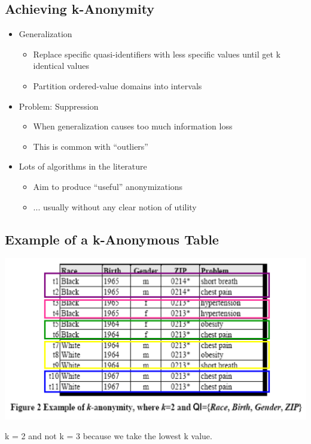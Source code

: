 \documentclass[11pt]{article}
\theoremstyle{definition}
\begin{document}
\subsection{Achieving k-Anonymity}
\begin{itemize}
    \item Generalization
    \begin{itemize}
        \item Replace specific quasi-identifiers with less specific values until get k identical values
        \item Partition ordered-value domains into intervals
    \end{itemize}
    \item Problem: Suppression
    \begin{itemize}
        \item When generalization causes too much information loss
        \item This is common with “outliers”
    \end{itemize}
    \item Lots of algorithms in the literature
    \begin{itemize}
        \item Aim to produce “useful” anonymizations
        \item ... usually without any clear notion of utility
    \end{itemize}
\end{itemize}

\subsection{Example of a k-Anonymous Table}
\includegraphics[width=\textwidth/2]{18.png}

k = 2 and not k = 3 because we take the lowest k value.
\end{document}
